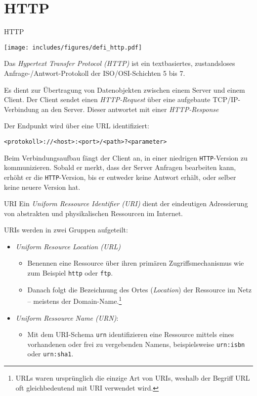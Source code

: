 \section{HTTP}

\begin{defi}{HTTP}
    \begin{center}
        \texttt{[image: includes/figures/defi\_http.pdf]}
    \end{center}

    Das \emph{Hypertext Transfer Protocol (HTTP)} ist ein textbasiertes, zustandsloses Anfrage-/Antwort-Protokoll der ISO/OSI-Schichten 5 bis 7.

    Es dient zur Übertragung von Datenobjekten zwischen einem Server und einem Client.
    Der Client sendet einen \emph{HTTP-Request} über eine aufgebaute TCP/IP-Verbindung an den Server.
    Dieser antwortet mit einer \emph{HTTP-Response}

    Der Endpunkt wird über eine URL identifiziert:

    \begin{center}
        \texttt{<protokoll>://<host>:<port>/<path>?<parameter>}
    \end{center}

    Beim Verbindungsaufbau fängt der Client an, in einer niedrigen \texttt{HTTP}-Version zu kommunizieren.
    Sobald er merkt, dass der Server Anfragen bearbeiten kann, erhöht er die \texttt{HTTP}-Version, bis er entweder keine Antwort erhält, oder selber keine neuere Version hat.
\end{defi}

\begin{defi}{URI}
    Ein \emph{Uniform Ressource Identifier (URI)} dient der eindeutigen Adressierung von abstrakten und physikalischen Ressourcen im Internet.

    URIs werden in zwei Gruppen aufgeteilt:
    \begin{itemize}
        \item \emph{Uniform Resource Location (URL)}
              \begin{itemize}
                  \item Benennen eine Ressource über ihren primären Zugriffsmechanismus wie zum Beispiel \texttt{http} oder \texttt{ftp}.
                  \item Danach folgt die Bezeichnung des Ortes (\emph{Location}) der Ressource im Netz – meistens der Domain-Name.\footnote{URLs waren ursprünglich die einzige Art von URIs, weshalb der Begriff URL oft gleichbedeutend mit URI verwendet wird.}
              \end{itemize}
        \item \emph{Uniform Ressource Name (URN)}:
              \begin{itemize}
                  \item Mit dem URI-Schema \texttt{urn} identifizieren eine Ressource mittels eines vorhandenen oder frei zu vergebenden Namens, beispielsweise \texttt{urn:isbn} oder \texttt{urn:sha1}.
              \end{itemize}
    \end{itemize}
\end{defi}

